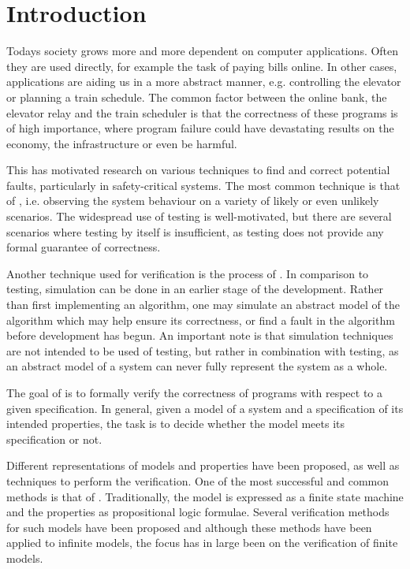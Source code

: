 \newpage
\section{Introduction}
Todays society grows more and more dependent on computer applications. Often they are used directly, for example the task of paying bills online. In other cases, applications are aiding us in a more abstract manner, e.g. controlling the elevator or planning a train schedule. The common factor between the online bank, the elevator relay and the train scheduler is that the correctness of these programs is of high importance, where program failure could have devastating results on the economy, the infrastructure or even be harmful.

This has motivated research on various techniques to find and correct potential faults, particularly in safety-critical systems. The most common technique is that of , i.e. observing the system behaviour on a variety of likely or even unlikely scenarios. The widespread use of testing is well-motivated, but there are several scenarios where testing by itself is insufficient, as testing does not provide any formal guarantee of correctness.

Another technique used for verification is the process of . In comparison to testing, simulation can be done in an earlier stage of the development. Rather than first implementing an algorithm, one may simulate an abstract model of the algorithm which may help ensure its correctness, or find a fault in the algorithm before development has begun. An important note is that simulation techniques are not intended to be used  of testing, but rather in combination with testing, as an abstract model of a system can never fully represent the system as a whole.

The goal of  is to formally verify the correctness of programs with respect to a given specification. In general, given a model of a system and a specification of its intended properties, the task is to decide whether the model meets its specification or not.

Different representations of models and properties have been proposed, as well as techniques to perform the verification. One of the most successful and common methods is that of . Traditionally, the model is expressed as a finite state machine and the properties as propositional logic formulae. Several verification methods for such models have been proposed\cite{mcmillan1993symbolic} and although these methods have been applied to infinite models\cite{705644}, the focus has in large been on the verification of finite models.

